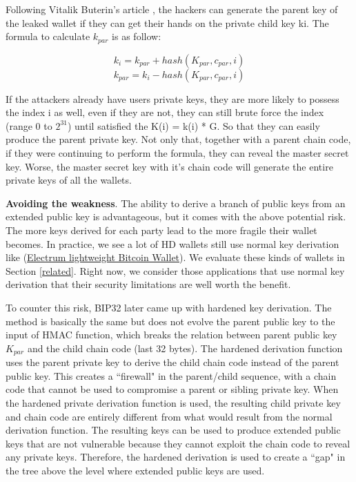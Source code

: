 \begin{adjustwidth}{1cm}{}
    Following Vitalik Buterin’s article \cite{Vitalik}, the hackers can generate the parent key of the leaked wallet if they can get their hands on the private child key ki. The formula to calculate $k_{par}$ is as follow:

    \begin{equation}
        k_i  = k_{par} + hash(K_{par}, c_{par}, i)
    \end{equation}
    \begin{equation}
        k_{par} = k_i - hash(K_{par}, c_{par}, i)
    \end{equation}

    \bigskip
    If the attackers already have users private keys, they are more likely to possess the index i as well, even if they are not, they can still brute force the index (range 0 to $2^{31}$) until satisfied the K(i) = k(i) * G. So that they can easily produce the parent private key. Not only that, together with a parent chain code, if they were continuing to perform the formula, they can reveal the master secret key. Worse, the master secret key with it’s chain code will generate the entire private keys of all the wallets.

    \bigskip
    {\textbf{Avoiding the weakness}}. The ability to derive a branch of public keys from an extended public key is advantageous, but it comes with the above potential risk. The more keys derived for each party lead to the more fragile their wallet becomes. In practice, we see a lot of HD wallets still use normal key derivation like (\href{https://electrum.org/#home}{Electrum lightweight Bitcoin Wallet}). We evaluate these kinds of wallets in Section \ref{related}. Right now, we consider those applications that use normal key derivation that their security limitations are well worth the benefit.

    To counter this risk, BIP32 later came up with hardened key derivation. The method is basically the same but does not evolve the parent public key to the input of HMAC function, which breaks the relation between parent public key $K_{par}$ and the child chain code (last 32 bytes). The hardened derivation function uses the parent private key to derive the child chain code instead of the parent public key. This creates a ``firewall" in the parent/child sequence, with a chain code that cannot be used to compromise a parent or sibling private key. When the hardened private derivation function is used, the resulting child private key and chain code are entirely different from what would result from the normal derivation function. The resulting keys can be used to produce extended public keys that are not vulnerable because they cannot exploit the chain code to reveal any private keys. Therefore, the hardened derivation is used to create a ``gap" in the tree above the level where extended public keys are used.


\end{adjustwidth}
